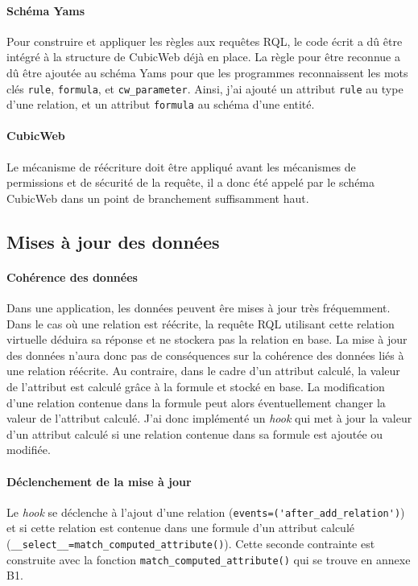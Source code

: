 \documentclass {report}
\begin{document}
\paragraph{Schéma Yams}
Pour construire et appliquer les règles aux requêtes RQL, le code écrit a dû être intégré à la structure de CubicWeb déjà en place. La règle pour être reconnue a dû être ajoutée au schéma Yams pour que les programmes reconnaissent les mots clés \verb+rule+, \verb+formula+, et \verb+cw_parameter+. Ainsi, j'ai ajouté un attribut \verb+rule+ au type d'une relation, et un attribut \verb+formula+ au schéma d'une entité.

\paragraph{CubicWeb}
Le mécanisme de réécriture doit être appliqué avant les mécanismes de permissions et de sécurité de la requête, il a donc été appelé par le schéma CubicWeb dans un point de branchement suffisamment haut.

\subsection{Mises à jour des données}
\paragraph{Cohérence des données}
Dans une application, les données peuvent êre mises à jour très fréquemment. Dans le cas où une relation est réécrite, la requête RQL utilisant cette relation virtuelle déduira sa réponse et ne stockera pas la relation en base. La mise à jour des données n'aura donc pas de conséquences sur la cohérence des données liés à une relation réécrite. Au contraire, dans le cadre d'un attribut calculé, la valeur de l'attribut est calculé grâce à la formule et stocké en base. La modification d'une relation contenue dans la formule peut alors éventuellement changer la valeur de l'attribut calculé. J'ai donc implémenté un \textit{hook} qui met à jour la valeur d'un attribut calculé si une relation contenue dans sa formule est ajoutée ou modifiée.


\paragraph{Déclenchement de la mise à jour}
Le \textit{hook} se déclenche à l'ajout d'une relation (\verb+events=('after_add_relation')+) et si cette relation est contenue dans une formule d'un attribut calculé (\verb+__select__=match_computed_attribute()+). Cette seconde contrainte est construite avec la fonction \verb+match_computed_attribute()+ qui se trouve en annexe B1.
\end{document}
